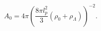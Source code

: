 \begin{equation}
A_{0}=4\pi \left( \frac{8\pi l_{p}^{2}}{3}\left( \rho _{0}+\rho _{\Lambda
}\right) \right) ^{-2}.
\end{equation}

